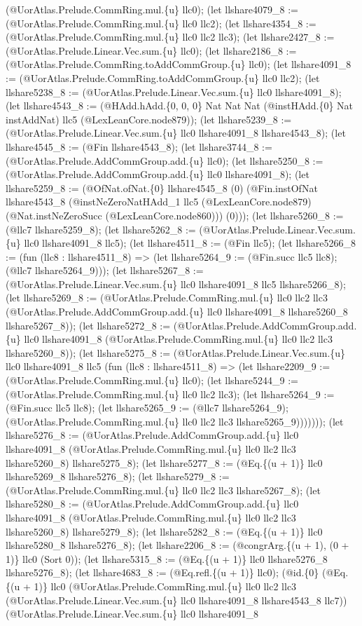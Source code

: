 \documentclass[11pt]{article}
\begin{document}
(@UorAtlas.Prelude.CommRing.mul.\{u\} llc0); (let llshare4079\_8 := (@UorAtlas.Prelude.CommRing.mul.\{u\} llc0 llc2); (let llshare4354\_8 := (@UorAtlas.Prelude.CommRing.mul.\{u\} llc0 llc2 llc3); (let llshare2427\_8 := (@UorAtlas.Prelude.Linear.Vec.sum.\{u\} llc0); (let llshare2186\_8 := (@UorAtlas.Prelude.CommRing.toAddCommGroup.\{u\} llc0); (let llshare4091\_8 := (@UorAtlas.Prelude.CommRing.toAddCommGroup.\{u\} llc0 llc2); (let llshare5238\_8 := (@UorAtlas.Prelude.Linear.Vec.sum.\{u\} llc0 llshare4091\_8); (let llshare4543\_8 := (@HAdd.hAdd.\{0, 0, 0\} Nat Nat Nat (@instHAdd.\{0\} Nat instAddNat) llc5 (@LexLeanCore.node879)); (let llshare5239\_8 := (@UorAtlas.Prelude.Linear.Vec.sum.\{u\} llc0 llshare4091\_8 llshare4543\_8); (let llshare4545\_8 := (@Fin llshare4543\_8); (let llshare3744\_8 := (@UorAtlas.Prelude.AddCommGroup.add.\{u\} llc0); (let llshare5250\_8 := (@UorAtlas.Prelude.AddCommGroup.add.\{u\} llc0 llshare4091\_8); (let llshare5259\_8 := (@OfNat.ofNat.\{0\} llshare4545\_8 (0) (@Fin.instOfNat llshare4543\_8 (@instNeZeroNatHAdd\_1 llc5 (@LexLeanCore.node879) (@Nat.instNeZeroSucc (@LexLeanCore.node860))) (0))); (let llshare5260\_8 := (@llc7 llshare5259\_8); (let llshare5262\_8 := (@UorAtlas.Prelude.Linear.Vec.sum.\{u\} llc0 llshare4091\_8 llc5); (let llshare4511\_8 := (@Fin llc5); (let llshare5266\_8 := (fun (llc8 : llshare4511\_8) => (let llshare5264\_9 := (@Fin.succ llc5 llc8); (@llc7 llshare5264\_9))); (let llshare5267\_8 := (@UorAtlas.Prelude.Linear.Vec.sum.\{u\} llc0 llshare4091\_8 llc5 llshare5266\_8); (let llshare5269\_8 := (@UorAtlas.Prelude.CommRing.mul.\{u\} llc0 llc2 llc3 (@UorAtlas.Prelude.AddCommGroup.add.\{u\} llc0 llshare4091\_8 llshare5260\_8 llshare5267\_8)); (let llshare5272\_8 := (@UorAtlas.Prelude.AddCommGroup.add.\{u\} llc0 llshare4091\_8 (@UorAtlas.Prelude.CommRing.mul.\{u\} llc0 llc2 llc3 llshare5260\_8)); (let llshare5275\_8 := (@UorAtlas.Prelude.Linear.Vec.sum.\{u\} llc0 llshare4091\_8 llc5 (fun (llc8 : llshare4511\_8) => (let llshare2209\_9 := (@UorAtlas.Prelude.CommRing.mul.\{u\} llc0); (let llshare5244\_9 := (@UorAtlas.Prelude.CommRing.mul.\{u\} llc0 llc2 llc3); (let llshare5264\_9 := (@Fin.succ llc5 llc8); (let llshare5265\_9 := (@llc7 llshare5264\_9); (@UorAtlas.Prelude.CommRing.mul.\{u\} llc0 llc2 llc3 llshare5265\_9))))))); (let llshare5276\_8 := (@UorAtlas.Prelude.AddCommGroup.add.\{u\} llc0 llshare4091\_8 (@UorAtlas.Prelude.CommRing.mul.\{u\} llc0 llc2 llc3 llshare5260\_8) llshare5275\_8); (let llshare5277\_8 := (@Eq.\{(u + 1)\} llc0 llshare5269\_8 llshare5276\_8); (let llshare5279\_8 := (@UorAtlas.Prelude.CommRing.mul.\{u\} llc0 llc2 llc3 llshare5267\_8); (let llshare5280\_8 := (@UorAtlas.Prelude.AddCommGroup.add.\{u\} llc0 llshare4091\_8 (@UorAtlas.Prelude.CommRing.mul.\{u\} llc0 llc2 llc3 llshare5260\_8) llshare5279\_8); (let llshare5282\_8 := (@Eq.\{(u + 1)\} llc0 llshare5280\_8 llshare5276\_8); (let llshare2206\_8 := (@congrArg.\{(u + 1), (0 + 1)\} llc0 (Sort 0)); (let llshare5315\_8 := (@Eq.\{(u + 1)\} llc0 llshare5276\_8 llshare5276\_8); (let llshare4683\_8 := (@Eq.refl.\{(u + 1)\} llc0); (@id.\{0\} (@Eq.\{(u + 1)\} llc0 (@UorAtlas.Prelude.CommRing.mul.\{u\} llc0 llc2 llc3 (@UorAtlas.Prelude.Linear.Vec.sum.\{u\} llc0 llshare4091\_8 llshare4543\_8 llc7)) (@UorAtlas.Prelude.Linear.Vec.sum.\{u\} llc0 llshare4091\_8 
\end{document}
